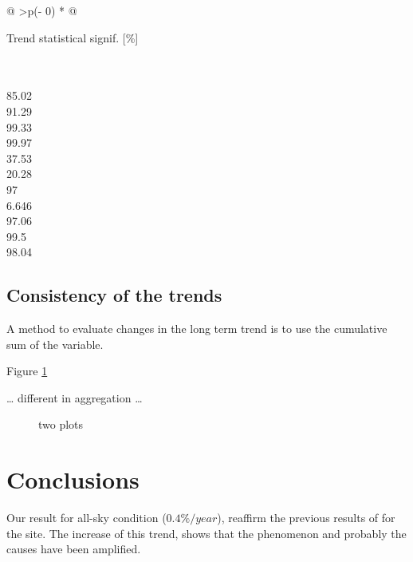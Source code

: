 \documentclass[preprint, 3p,
authoryear]{elsarticle} %
\begin{document}
\begin{longtable}[]{@{}
  >{\centering\arraybackslash}p{(\columnwidth - 0\tabcolsep) * }@{}}
\toprule\noalign{}
\begin{minipage}[b]{\linewidth}\centering
Trend statistical signif. {[}\%{]}
\end{minipage} \\
\midrule\noalign{}
\endhead
\bottomrule\noalign{}
 \\
85.02 \\
91.29 \\
99.33 \\
99.97 \\
37.53 \\
20.28 \\
97 \\
6.646 \\
97.06 \\
99.5 \\
98.04 \\
\end{longtable}

\hypertarget{consistency-of-the-trends}{%
\subsection{Consistency of the trends}\label{consistency-of-the-trends}}

A method to evaluate changes in the long term trend is to use the
cumulative sum of the variable.

Figure \ref{fig:cumsum}

\ldots{} different in aggregation \ldots{}

\begin{figure}[h!]

{\centering {}

}

\caption{two plots}\label{fig:cumsum}
\end{figure}

\hypertarget{conclusions}{%
\section{Conclusions}\label{conclusions}}

Our result for all-sky condition (\(0.4\%/year\)), reaffirm the previous
results of \citet{Bais2013} for the site. The increase of this trend,
shows that the phenomenon and probably the causes have been amplified.
\end{document}
